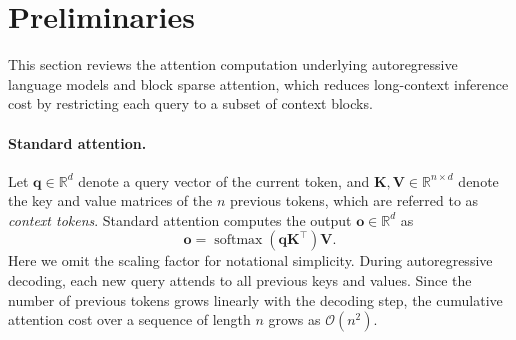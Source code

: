 \section{Preliminaries}
\label{sec:preliminary}

This section reviews the attention computation underlying autoregressive language models and block sparse attention, which reduces long-context inference cost by restricting each query to a subset of context blocks.

\paragraph{Standard attention.}
Let $\mathbf{q} \in \mathbb{R}^{d}$ denote a query vector of the current token, and $\mathbf{K}, \mathbf{V} \in \mathbb{R}^{n \times d}$ denote the key and value matrices of the $n$ previous tokens, which are referred to as \textit{context tokens}.
Standard attention \cite{vaswani2017attention} computes the output $\mathbf{o} \in \mathbb{R}^d$ as
\begin{equation}
    \mathbf{o} = \operatorname{softmax}(\mathbf{q} \mathbf{K}^\top) \mathbf{V}.
    \label{eqn:fula}
\end{equation}
Here we omit the scaling factor for notational simplicity. During autoregressive decoding, each new query attends to all previous keys and values. Since the number of previous tokens grows linearly with the decoding step, the cumulative attention cost over a sequence of length $n$ grows as $\mathcal{O}(n^2)$.


